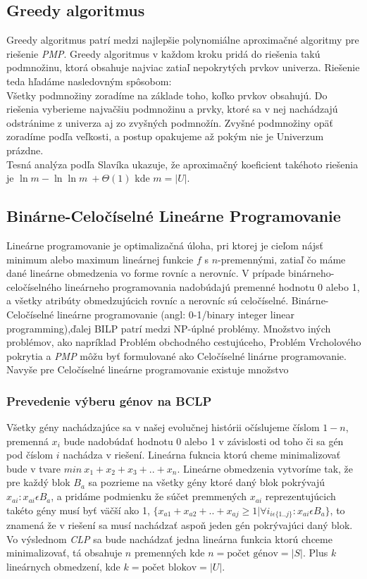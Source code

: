 \subsection{Greedy algoritmus}
Greedy algoritmus patrí medzi najlepšie polynomiálne aproximačné algoritmy pre riešenie \emph{PMP}.\cite{Slavik}
Greedy algoritmus v každom kroku pridá do riešenia takú podmnožinu,
ktorá obsahuje najviac zatiaľ nepokrytých prvkov univerza. Riešenie teda hľadáme nasledovným spôsobom:\\
Všetky podmnožiny zoradíme na základe toho, koľko prvkov obsahujú.
Do riešenia vyberieme najvačšiu podmnožinu a prvky, ktoré sa v nej nachádzajú odstránime z
univerza aj zo zvyšných podmnožín. Zvyšné podmnožiny opäť zoradíme podľa veľkosti,
a postup opakujeme až pokým nie je Univerzum prázdne.\\
Tesná analýza podľa Slavíka ukazuje, že aproximačný koeficient takéhoto riešenia je \(\ln m - \ln \ln m\ +\Theta(1) \) \cite{Slavik} 
kde \(m = |U|\).
\subsection{Binárne-Celočíselné Lineárne Programovanie}
\label{sub:bclp}
Lineárne programovanie je optimalizačná úloha, pri ktorej je cieľom nájsť minimum alebo
maximum lineárnej funkcie $f$ s $n$-premennými, zatiaľ čo máme dané lineárne obmedzenia vo forme rovníc a nerovníc.
V prípade binárneho-celočíselného lineárneho programovania nadobúdajú premenné hodnotu 0 alebo 1,
a všetky atribúty obmedzujúcich rovníc a nerovníc sú celočíselné.
Binárne-Celočíselné lineárne programovanie (angl: 0-1/binary integer linear programming),ďalej BILP patrí medzi NP-úplné problémy.\cite{Karp}
Množstvo iných problémov, ako napríklad Problém obchodného cestujúceho, Problém Vrcholového pokrytia a \emph{PMP} môžu byť formulované ako Celočíselné linárne programovanie.
Navyše pre Celočíselné lineárne programovanie existuje množstvo 
\subsubsection{Prevedenie výberu génov na BCLP}
Všetky gény nachádzajúce sa v našej evolučnej histórii očíslujeme číslom $1-n$, 
premenná $x_i$ bude nadobúdať hodnotu 0 alebo 1 v závislosti od toho či sa gén pod číslom $i$ nachádza v riešení.
Lineárna fukncia ktorú cheme minimalizovať bude v tvare $min\ x_1 + x_2 +x_3 + .. +x_n$. Lineárne obmedzenia vytvoríme tak,
že pre každý blok $B_a$ sa pozrieme na všetky gény ktoré daný blok pokrývajú $x_{ai}:x_{ai} \epsilon B_a$,
a pridáme podmienku že súčet premmených $x_{ai}$ reprezentujúcich takéto gény musí byť väčší ako 1,
\( \{x_{a1}+x_{a2}+..+x_{aj} \geq 1|\forall i_{i\epsilon \{1..j\}}:x_{ai}\epsilon B_a \}\),
to znamená že v riešení sa musí nachádzať aspoň jeden gén pokrývajúci daný blok.
Vo výslednom \emph{CLP} sa bude nachádzať jedna lineárna funkcia ktorú chceme minimalizovať, tá obsahuje $n$ premenných kde \(n=\text{počet génov}=|S|\).
Plus $k$ lineárnych obmedzení, kde \(k=\text{počet blokov}=|U|\).
